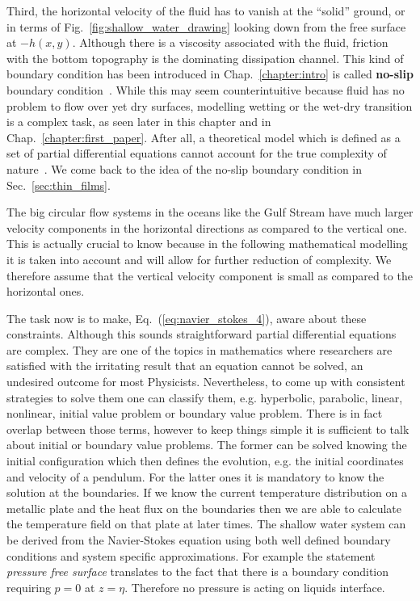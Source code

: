 Third, the horizontal velocity of the fluid has to vanish at the ``solid'' ground, or in terms of Fig.~\ref{fig:shallow_water_drawing} looking down from the free surface at $-h(x,y)$.
Although there is a viscosity associated with the fluid, friction with the bottom topography is the dominating dissipation channel.
This kind of boundary condition has been introduced in Chap.~\ref{chapter:intro} is called \textbf{no-slip} boundary condition~\cite{richardsonNoslipBoundaryCondition1973, degennesFluidWallSlippage2002, salmonLatticeBoltzmannMethod1999}.
While this may seem counterintuitive because fluid has no problem to flow over yet dry surfaces, modelling wetting or the wet-dry transition is a complex task, as seen later in this chapter and in Chap.~\ref{chapter:first_paper}.
After all, a theoretical model which is defined as a set of partial differential equations cannot account for the true complexity of nature~\cite{scrivenPhysicsApplicationsDIP1988}.
We come back to the idea of the no-slip boundary condition in Sec.~\ref{sec:thin_films}.

The big circular flow systems in the oceans like the Gulf Stream have much larger velocity components in the horizontal directions as compared to the vertical one.  
This is actually crucial to know because in the following mathematical modelling it is taken into account and will allow for further reduction of complexity.
We therefore assume that the vertical velocity component is small as compared to the horizontal ones.

The task now is to make, Eq.~(\ref{eq:navier_stokes_4}), aware about these constraints.
Although this sounds straightforward partial differential equations are complex. 
They are one of the topics in mathematics where researchers are satisfied with the irritating result that an equation cannot be solved, an undesired outcome for most Physicists.
Nevertheless, to come up with consistent strategies to solve them one can classify them, e.g. hyperbolic, parabolic, linear, nonlinear, initial value problem or boundary value problem.
There is in fact overlap between those terms, however to keep things simple it is sufficient to talk about initial or boundary value problems.
The former can be solved knowing the initial configuration which then defines the evolution, e.g. the initial coordinates and velocity of a pendulum. 
For the latter ones it is mandatory to know the solution at the boundaries. 
If we know the current temperature distribution on a metallic plate and the heat flux on the boundaries then we are able to calculate the temperature field on that plate at later times.
The shallow water system can be derived from the Navier-Stokes equation using both well defined boundary conditions and system specific approximations.
For example the statement \textit{pressure free surface} translates to the fact that there is a boundary condition requiring $p = 0$ at $z = \eta$. 
Therefore no pressure is acting on liquids interface.


